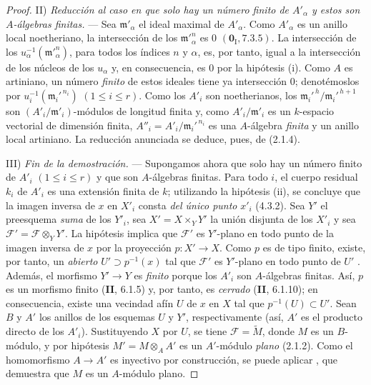 \begin{proof}
\medskip
\noindent II) \emph{Reducción al caso en que solo hay un número finito de $A'_\alpha$ y estos son $A$-álgebras finitas.} --- Sea $\mathfrak m'_\alpha$
el ideal maximal de $A'_\alpha$. Como $A'_\alpha$ es un anillo local noetheriano, la intersección de los $\mathfrak m'^n_\alpha$
es $0$ $(\mathbf 0_{\mathrm I},7.3.5)$. La intersección de los $u_\alpha^{-1}(\mathfrak m'^n_\alpha)$, para todos los índices $n$ y $\alpha$, es, por tanto,
igual a la intersección de los núcleos de los $u_\alpha$ y, en consecuencia, es $0$ por la hipótesis (i). Como $A$
es artiniano, un número \emph{finito} de estos ideales tiene ya intersección $0$; denotémoslos por
$u_i^{-1}(\mathfrak m_i'^{\,n_i})$ $(1\leq i\leq r)$. Como los $A'_i$ son noetherianos, los $\mathfrak m_i'^{\,h}/\mathfrak m_i'^{\,h+1}$ son
$(A'_i/\mathfrak m'_i)$-módulos de longitud finita y, como $A'_i/\mathfrak m'_i$ es un $k$-espacio vectorial de dimensión finita,
$A''_i=A'_i/\mathfrak m_i'^{\,n_i}$ es una $A$-álgebra \emph{finita} y un anillo local artiniano. La reducción anunciada
se deduce, pues, de (2.1.4).

\medskip
\noindent III) \emph{Fin de la demostración.} --- Supongamos ahora que solo hay un número finito de $A'_i$ $(1\leq i\leq r)$ y que
son $A$-álgebras finitas. Para todo $i$, el cuerpo residual $k_i$ de $A'_i$ es una extensión finita de $k$; utilizando
la hipótesis (ii), se concluye que la imagen inversa de $x$ en $X'_i$ consta \emph{del único punto} $x'_i$ (4.3.2).
Sea $Y'$ el preesquema \emph{suma} de los $Y'_i$, sea $X'=X\times_Y Y'$ la unión disjunta de los
$X'_i$ y sea $\mathcal F'=\mathcal F\otimes_Y Y'$. La hipótesis implica que $\mathcal F'$ es $Y'$-plano en todo
punto de la imagen inversa de $x$ por la proyección $p:X'\to X$. Como $p$ es de tipo finito, existe, por tanto, un
\emph{abierto} $U'\supset p^{-1}(x)$ tal que $\mathcal F'$ es $Y'$-plano en todo punto de $U'$ .
Además, el morfismo $Y'\to Y$ es \emph{finito} porque los $A'_i$ son $A$-álgebras finitas. Así, $p$ es un
morfismo finito (\textbf{II}, 6.1.5) y, por tanto, es \emph{cerrado} (\textbf{II}, 6.1.10); en consecuencia, existe una vecindad afín $U$ de
$x$ en $X$ tal que $p^{-1}(U)\subset U'$. Sean $B$ y $A'$ los anillos de los esquemas
$U$ y $Y'$, respectivamente (así, $A'$ es el producto directo de los $A'_i$). Sustituyendo $X$ por
$U$, se tiene $\mathcal F=\widetilde M$, donde $M$ es un $B$-módulo, y por hipótesis
$M'=M\otimes_A A'$ es un $A'$-módulo \emph{plano} (2.1.2). Como el homomorfismo
$A\to A'$ es inyectivo por construcción, se puede aplicar , que demuestra que $M$ es un
$A$-módulo plano.
\end{proof}

